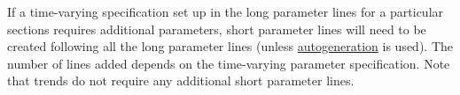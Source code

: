 
	 


If a time-varying specification set up in the long parameter lines for a particular sections requires additional parameters, short parameter lines will need to be created following all the long parameter lines (unless \hyperlink{autogen}{autogeneration} is used). The number of lines added depends on the time-varying parameter specification. Note that trends do not require any additional short parameter lines.

